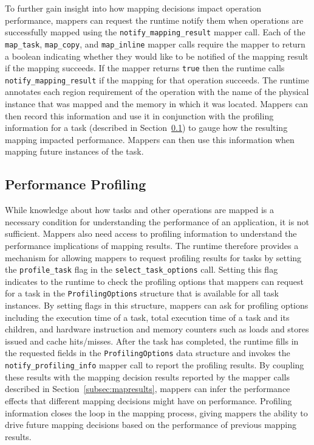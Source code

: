 To further gain insight into how mapping decisions
impact operation performance, mappers can request 
the runtime notify them when operations are successfully 
mapped using the {\tt notify\_mapping\_result} mapper 
call. Each of the {\tt map\_task}, {\tt map\_copy}, and
{\tt map\_inline} mapper calls require the mapper
to return a boolean indicating whether they would
like to be notified of the mapping result if the
mapping succeeds. If the mapper returns {\tt true}
then the runtime calls {\tt notify\_mapping\_result}
if the mapping for that operation succeeds.  The
runtime annotates each region requirement of the 
operation with the name of the physical instance
that was mapped and the memory in which it was
located. Mappers can then record this information
and use it in conjunction with the profiling 
information for a task (described in 
Section~\ref{subsec:profiling}) to gauge how the
resulting mapping impacted performance.  Mappers
can then use this information when mapping
future instances of the task.

\subsection{Performance Profiling}
\label{subsec:profiling}
While knowledge about how tasks and other operations
are mapped is a necessary condition for understanding the
performance of an application, it is not sufficient.
Mappers also need access to profiling information
to understand the performance implications of
mapping results. The runtime therefore provides
a mechanism for allowing mappers to request profiling
results for tasks by setting the {\tt profile\_task}
flag in the {\tt select\_task\_options} call. 
Setting this flag indicates to the runtime to check
the profiling options that mappers can request for
a task in the {\tt ProfilingOptions} structure that
is available for all task instances. By setting flags
in this structure, mappers can ask for profiling 
options including the execution time of a task,
total execution time of a task and its children,
and hardware instruction and memory counters such
as loads and stores issued and cache hits/misses.
After the task has completed, the runtime fills in 
the requested fields in the {\tt ProfilingOptions}
data structure and invokes the {\tt notify\_profiling\_info}
mapper call to report the profiling results. By
coupling these results with the mapping decision
results reported by the mapper calls described in
Section~\ref{subsec:mapresults}, mappers can infer
the performance effects that different mapping
decisions might have on performance. Profiling information
closes the loop in the mapping process, giving 
mappers the ability to drive future mapping
decisions based on the performance of previous
mapping results.

